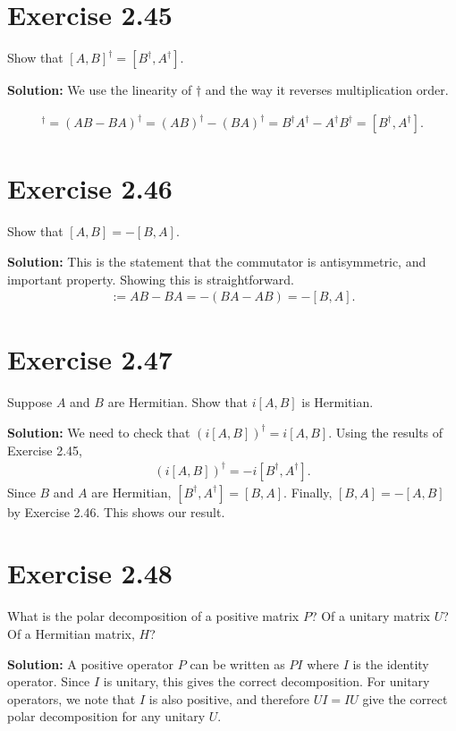 \documentclass{book}
\begin{document}
\section*{Exercise 2.45}
    Show that $[A, B]^\dagger = [B^\dagger, A^\dagger]$.
    
    \textbf{Solution:} We use the linearity of $\dagger$ and the way it reverses multiplication order.
    
    \begin{align}
        [A,B]^\dagger = (AB-BA)^\dagger = (AB)^\dagger - (BA)^\dagger = B^\dagger A^\dagger - A^\dagger B^\dagger = [B^\dagger, A^\dagger].
    \end{align}
    
\section*{Exercise 2.46}
    Show that $[A, B] = -[B, A]$.
    
    \textbf{Solution:} This is the statement that the commutator is antisymmetric, and important property. Showing this is straightforward.
    \begin{align}
        [A,B] :=AB - BA = -(BA-AB) = -[B,A].
    \end{align}
    
\section*{Exercise 2.47}
    Suppose $A$ and $B$ are Hermitian. Show that $i[A, B]$ is Hermitian.
    
    \textbf{Solution:} We need to check that $(i[A,B])^\dagger = i[A,B]$. Using the results of Exercise 2.45,
    \begin{align}
        (i[A,B])^\dagger = -i [B^\dagger, A^\dagger].
    \end{align}
    Since $B$ and $A$ are Hermitian, $[B^\dagger, A^\dagger] = [B,A]$. Finally, $[B,A] = -[A,B]$ by Exercise 2.46. This shows our result.
    
\section*{Exercise 2.48}
    What is the polar decomposition of a positive matrix $P$? Of a unitary matrix $U$? Of a Hermitian matrix, $H$?
    
    \textbf{Solution:} A positive operator $P$ can be written as $P I$ where $I$ is the identity operator. Since $I$ is unitary, this gives the correct decomposition. For unitary operators, we note that $I$ is also positive, and therefore $U I = I U$ give the correct polar decomposition for any unitary $U$. 
    
\end{document}
